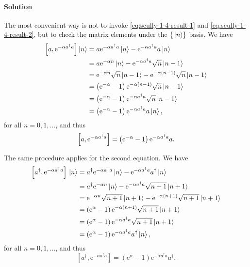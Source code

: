 \documentclass[hyperref, a4paper]{article}
\newcommand*{\ee}{\mathrm{e}}
\begin{document}
\paragraph{Solution} The most convenient way is not to invoke \eqref{eq:scully-1-4-result-1} and \eqref{eq:scully-1-4-result-2}, but to check the matrix elements under the $\{\ket*{n}\}$ basis.
We have
\[
    \begin{aligned}
        \comm{a}{\ee^{-\alpha a^\dagger a}} \ket*{n} &= a \ee^{-\alpha a^\dagger a} \ket*{n} - \ee^{-\alpha a^\dagger a} a \ket*{n} \\
        &= a \ee^{- \alpha n} \ket*{n} - \ee^{- \alpha a^\dagger a} \sqrt{n} \ket*{n-1} \\
        &= \ee^{- \alpha n} \sqrt{n} \ket*{n-1} - \ee^{- \alpha (n-1)} \sqrt{n} \ket*{n-1} \\
        &= \left( \ee^{-\alpha} - 1 \right) \ee^{- \alpha (n-1)} \sqrt{n} \ket*{n-1} \\
        &= \left( \ee^{-\alpha} - 1 \right) \ee^{- \alpha a^\dagger a} \sqrt{n} \ket*{n-1} \\
        &= \left( \ee^{-\alpha} - 1 \right) \ee^{- \alpha a^\dagger a} a \ket*{n},
    \end{aligned}
\]
for all $n = 0, 1, \ldots$, and thus 
\begin{equation}
    \comm{a}{\ee^{-\alpha a^\dagger a}} = \left( \ee^{-\alpha} - 1 \right) \ee^{- \alpha a^\dagger a} a.
\end{equation}

The same procedure applies for the second equation. We have
\[
    \begin{aligned}
        \left[a^{\dagger}, \ee^{-\alpha a^{\dagger} a}\right] \ket*{n} &= a^\dagger \ee^{-\alpha a^{\dagger} a} \ket*{n} - \ee^{-\alpha a^{\dagger} a} a^\dagger \ket*{n} \\
        &= a^\dagger \ee^{-\alpha n} \ket*{n} - \ee^{-\alpha a^{\dagger} a} \sqrt{n+1} \ket*{n+1} \\
        &=  \ee^{-\alpha n} \sqrt{n+1} \ket*{n+1} - \ee^{-\alpha (n+1)} \sqrt{n+1} \ket*{n+1} \\
        &= \left( \ee^{\alpha} -1 \right) \ee^{-\alpha(n+1)} \sqrt{n+1} \ket*{n+1} \\
        &= \left( \ee^{\alpha} -1 \right) \ee^{-\alpha a^\dagger a} \sqrt{n+1} \ket*{n+1} \\
        &= \left( \ee^{\alpha} -1 \right) \ee^{-\alpha a^\dagger a} a^\dagger \ket*{n}, 
    \end{aligned}
\]
for all $n = 0, 1, \ldots$, and thus
\begin{equation}
    {\left[a^{\dagger}, \ee^{-\alpha a^{\dagger} a}\right]=\left(\ee^{\alpha}-1\right) \ee^{-\alpha a^{\dagger} a} a^{\dagger}}.
\end{equation}
\end{document}
